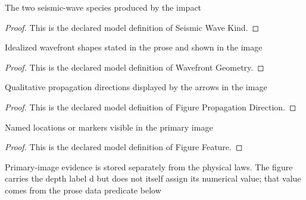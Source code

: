 \begin{definition}
  \label{def:physics:phyx-mini-0326:phyxminiproblems-problemphyxmini0326-seismicwavekind}
  The two seismic-wave species produced by the impact
\end{definition}
\begin{proof}
  This is the declared model definition of Seismic Wave Kind.
\end{proof}
\begin{definition}
  \label{def:physics:phyx-mini-0326:phyxminiproblems-problemphyxmini0326-wavefrontgeometry}
  Idealized wavefront shapes stated in the prose and shown in the image
\end{definition}
\begin{proof}
  This is the declared model definition of Wavefront Geometry.
\end{proof}
\begin{definition}
  \label{def:physics:phyx-mini-0326:phyxminiproblems-problemphyxmini0326-figurepropagationdirection}
  Qualitative propagation directions displayed by the arrows in the image
\end{definition}
\begin{proof}
  This is the declared model definition of Figure Propagation Direction.
\end{proof}
\begin{definition}
  \label{def:physics:phyx-mini-0326:phyxminiproblems-problemphyxmini0326-figurefeature}
  Named locations or markers visible in the primary image
\end{definition}
\begin{proof}
  This is the declared model definition of Figure Feature.
\end{proof}
\begin{definition}
  \label{def:physics:phyx-mini-0326:phyxminiproblems-problemphyxmini0326-seismicpropagationfigure}
  Primary-image evidence is stored separately from the physical laws. The figure carries the depth label d but does not itself assign its numerical value; that value comes from the prose data predicate below
\end{definition}
